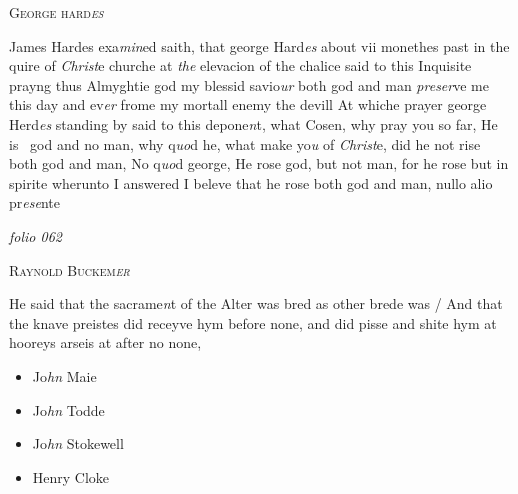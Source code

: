 \documentclass[12pt, a4paper]{book}
\begin{document}
               
               	
				\begin{center}  {\scshape George hard\textit{es}
                  }  \end{center}
			
               	
               		
				\marginpar[\vspace{0.5cm}{\textcolor{Gray}{herecie}}]{}
			
               		
				\marginpar[\vspace{0.5cm}{\textcolor{Gray}{n}}]{}
			
               		
		\ifthenelse{\isodd{\thepage}}
		{\reversemarginpar}
		{\normalmarginpar}
		James Hardes exa\textit{min}ed saith, that george Hard\textit{es} about
 vii monethes past in the quire of \textit{Christ}e churche at \textit{the}
 elevacion of the chalice said to this Inquisite prayng thus
 Almyghtie god my blessid savio\textit{ur} both god and man \textit{preser}ve
 me this day and ev\textit{er} frome my mortall enemy the devill
 At whiche prayer george Herd\textit{es} standing by said to this
  depone\textit{n}t, what Cosen, why pray you so far, He is 
  god and no man, why q\textit{uo}d he, what make yo\textit{u }of \textit{Christ}e,
               			did he not rise both god and man, No q\textit{uo}d george, He
 rose god, but not man, for he rose but in spirite
 wherunto I answered I beleve that he rose both god
 and man, nullo alio pr\textit{ese}nte


               

\dotfill
						\newpage
{}

\textit{folio 062}


               
               	
				\begin{center}  {\scshape Raynold Buckem\textit{er}
                  }  \end{center}
			
               	
               		
				\marginpar[\vspace{0.5cm}{\textcolor{Gray}{herecie}}]{}
			
			
		\ifthenelse{\isodd{\thepage}}
		{\reversemarginpar}
		{\normalmarginpar}
		He said that the sacrame\textit{n}t of the Alter was bred
  as other brede was / And that the knave preistes did
 receyve hym before none, and did pisse and shite hym
 at hooreys arseis at after no none,
               	

	\begin{itemize}
		\item[]Jo\textit{hn} Maie
		\item[]Jo\textit{hn} Todde
		\item[]Jo\textit{hn} Stokewell
		\item[]Henry Cloke
	\end{itemize}
	
\end{document}
